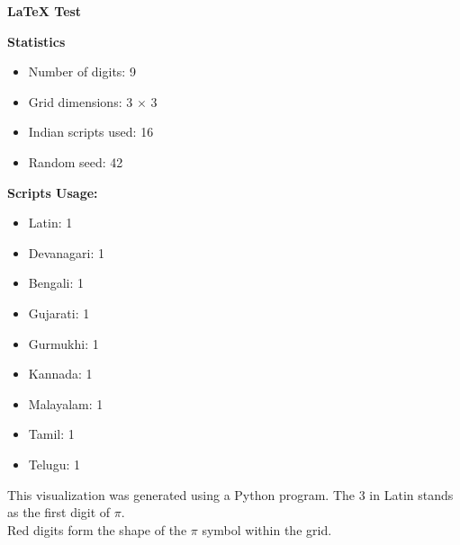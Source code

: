 \documentclass[a4paper,10pt]{article}
\begin{document}
\begin{center}
\Huge\textbf{LaTeX Test}
\end{center}

\begin{center}
\end{center}

\vspace{0.5cm}
\begin{center}
\textbf{Statistics}
\end{center}

\begin{multicols}{2}
\begin{itemize}
\item Number of digits: 9
\item Grid dimensions: 3 $\times$ 3
\item Indian scripts used: 16
\item Random seed: 42
\end{itemize}

\columnbreak

\textbf{Scripts Usage:}
\begin{itemize}
\item Latin: 1
\item Devanagari: 1
\item Bengali: 1
\item Gujarati: 1
\item Gurmukhi: 1
\item Kannada: 1
\item Malayalam: 1
\item Tamil: 1
\item Telugu: 1
\end{itemize}
\end{multicols}

\vspace{1cm}
\begin{center}
\small This visualization was generated using a Python program. The 3 in Latin stands as the first digit of $\pi$.\\
Red digits form the shape of the $\pi$ symbol within the grid.
\end{center}
\end{document}
